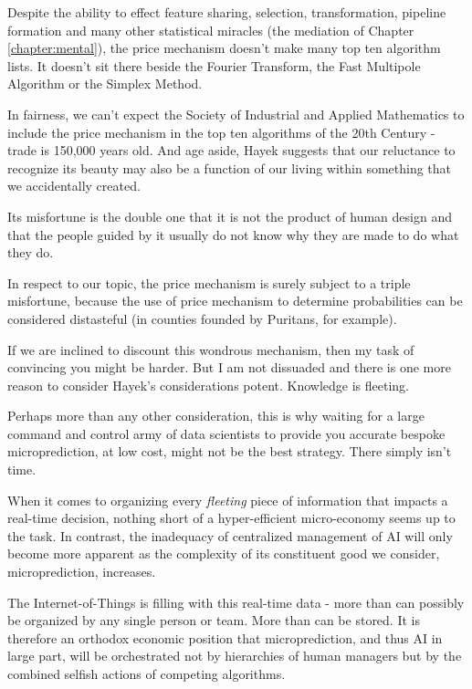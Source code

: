 Despite the ability to effect feature sharing, selection, transformation, pipeline formation and many other statistical miracles (the mediation of Chapter \ref{chapter:mental}), the price mechanism doesn't make many top ten algorithm lists. It doesn't sit there beside the Fourier Transform, the Fast Multipole Algorithm or the Simplex Method.

In fairness, we can't expect the Society of Industrial and Applied Mathematics to include the price mechanism in the top ten algorithms of the 20th Century - trade is 150,000 years old. And age aside, Hayek suggests that our reluctance to recognize its beauty may also be a function of our living within something that we accidentally created.    
\begin{oldquote}
Its misfortune is the double one that it is not the product of human design and that the people guided by it usually do not know why they are made to do what they do. 
\end{oldquote}
In respect to our topic, the price mechanism is surely subject to a triple misfortune, because the use of price mechanism to determine probabilities can be considered distasteful (in counties founded by Puritans, for example). 

If we are inclined to discount this wondrous mechanism, then my task of convincing you might be harder. But I am not dissuaded and there is one more reason to consider Hayek's considerations potent. Knowledge is fleeting. 

Perhaps more than any other consideration, this is why waiting for a large command and control army of data scientists to provide you accurate bespoke microprediction, at low cost, might not be the best strategy. There simply isn't time. 

When it comes to organizing every {\em fleeting} piece of information that impacts a real-time decision, nothing short of a hyper-efficient micro-economy seems up to the task. In contrast, the inadequacy of centralized management of AI will only become more apparent as the complexity of its constituent good we consider, microprediction, increases. 

The Internet-of-Things is filling with this real-time data - more than can possibly be organized by any single person or team. More than can be stored. It is therefore an orthodox economic position that microprediction, and thus AI in large part, will be orchestrated not by hierarchies of human managers but by the combined selfish actions of competing algorithms. 

